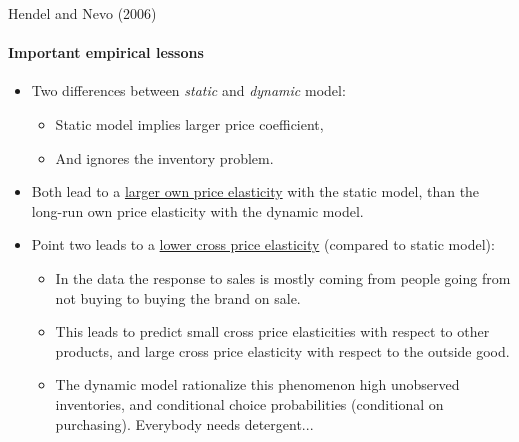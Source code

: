 \documentclass[11pt,aspectratio=169]{beamer}
\begin{document}
\begin{frame}{Hendel and Nevo (2006)}
\framesubtitle{Important empirical lessons}
\vspace{-0.3cm}
\begin{itemize}\footnotesize
\item[$-$] Two differences between \textit{static} and \textit{dynamic} model: 
\begin{itemize}\footnotesize
\item[$-$] Static model implies larger price coefficient,
\item[$-$] And ignores the inventory problem.
\end{itemize}
\item[$-$] Both lead to a \underline{larger own price elasticity} with the static model, than the
long-run own price elasticity with the dynamic model.
\item[$-$] Point two leads to a \underline{lower cross price elasticity} (compared to static model):
\begin{itemize}\footnotesize
\item[$-$] In the data the response to sales is mostly coming from people going
from not buying to buying the brand on sale.
\item[$-$] This leads to predict small cross price elasticities with respect to other
products, and large cross price elasticity with respect to the outside
good.
\item[$-$] The dynamic model rationalize this phenomenon high unobserved inventories,
and conditional choice probabilities (conditional on purchasing).
Everybody needs detergent...
\end{itemize}
\end{itemize}
\end{frame}
\end{document}
